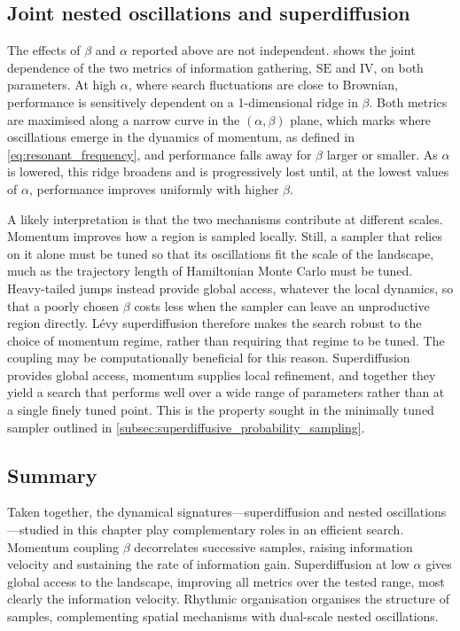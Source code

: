 \subsection*{Joint nested oscillations and superdiffusion}
The effects of $\beta$ and $\alpha$ reported above are not independent.  shows the joint dependence of the two metrics of information gathering, $\mathrm{SE}$ and $\mathrm{IV}$, on both parameters. At high $\alpha$, where search fluctuations are close to Brownian, performance is sensitively dependent on a 1-dimensional ridge in $\beta$. Both metrics are maximised along a narrow curve in the $(\alpha,\beta)$ plane, which marks where oscillations emerge in the dynamics of momentum, as defined in \cref{eq:resonant_frequency}, and performance falls away for $\beta$ larger or smaller. As $\alpha$ is lowered, this ridge broadens and is progressively lost until, at the lowest values of $\alpha$, performance improves uniformly with higher $\beta$.

A likely interpretation is that the two mechanisms contribute at different scales. Momentum improves how a region is sampled locally. Still, a sampler that relies on it alone must be tuned so that its oscillations fit the scale of the landscape, much as the trajectory length of Hamiltonian Monte Carlo must be tuned. Heavy-tailed jumps instead provide global access, whatever the local dynamics, so that a poorly chosen $\beta$ costs less when the sampler can leave an unproductive region directly. Lévy superdiffusion therefore makes the search robust to the choice of momentum regime, rather than requiring that regime to be tuned. The coupling may be computationally beneficial for this reason. Superdiffusion provides global access, momentum supplies local refinement, and together they yield a search that performs well over a wide range of parameters rather than at a single finely tuned point. This is the property sought in the minimally tuned sampler outlined in \cref{subsec:superdiffusive_probability_sampling}.

\subsection*{Summary }
Taken together, the dynamical signatures---superdiffusion and nested oscillations---studied in this chapter play complementary roles in an efficient search.
Momentum coupling $\beta$ decorrelates successive samples, raising information velocity and sustaining the rate of information gain. Superdiffusion at low $\alpha$ gives global access to the landscape, improving all metrics over the tested range, most clearly the information velocity. Rhythmic organisation organises the structure of samples, complementing spatial mechanisms with dual-scale nested oscillations.